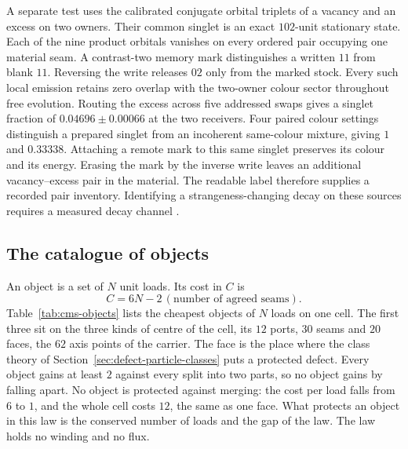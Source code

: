 A separate test uses the calibrated conjugate orbital triplets
of a vacancy and an excess on two owners. Their common singlet is an
exact $102$-unit stationary state. Each of the nine product orbitals
vanishes on every ordered pair occupying one material seam. A
contrast-two memory mark distinguishes a written $11$ from blank $11$.
Reversing the write releases $02$ only from the marked stock. Every such
local emission retains zero overlap with the two-owner colour sector
throughout free evolution. Routing the excess across five addressed
swaps gives a singlet fraction of $0.04696\pm0.00066$ at the two
receivers. Four paired colour settings distinguish a prepared singlet
from an incoherent same-colour mixture, giving $1$ and $0.33338$.
Attaching a remote mark to this same singlet preserves its colour and
its energy. Erasing the mark by the inverse write leaves an additional
vacancy--excess pair in the material. The readable label therefore
supplies a recorded pair inventory. Identifying a strangeness-changing
decay on these sources requires a measured decay channel \cite{ophmodel}.

\subsection{The catalogue of objects}
\label{sec:cms-catalogue}

An object is a set of $N$ unit loads. Its cost in $C$ is
\[
 C=6N-2\,(\text{number of agreed seams}).
\]
Table~\ref{tab:cms-objects} lists the cheapest objects of $N$ loads on one cell. The first
three sit on the three kinds of centre of the cell, its $12$ ports, $30$ seams and $20$
faces, the $62$ axis points of the carrier. The face is the place where the class theory of
Section~\ref{sec:defect-particle-classes} puts a protected defect. Every object gains at
least $2$ against every split into two parts, so no object gains by falling apart. No
object is protected against merging: the cost per load falls from $6$ to $1$, and the whole
cell costs $12$, the same as one face. What protects an object in this law is the
conserved number of loads and the gap of the law. The law holds no winding and no flux.

